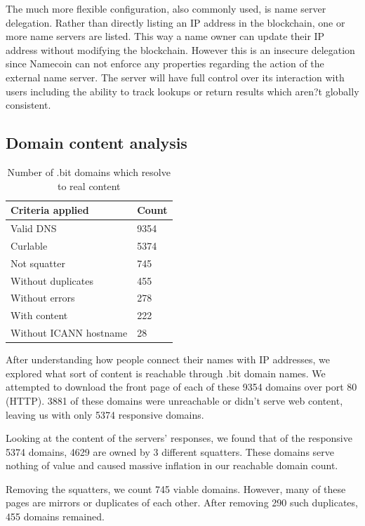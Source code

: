 The much more flexible configuration, also commonly used, is name server delegation. Rather than directly listing an IP address in the blockchain, one or more name servers are listed. This way a name owner can update their IP address without modifying the blockchain. However this is an insecure delegation since Namecoin can not enforce any properties regarding the action of the external name server. The server will have full control over its interaction with users including the ability to track lookups or return results which aren?t globally consistent.

\subsection{Domain content analysis}
\label{domainbreakdown}

\begin{table}[t]
\centering
\begin{tabular}{ll}
Criteria applied & Count \\ \hline
Valid DNS          &  9354  \\
Curlable        & 5374     \\
Not squatter        & 745     \\
Without duplicates      & 455     \\
Without errors              & 278    \\
With content              & 222    \\
Without ICANN hostname   & 28   \\
\end{tabular}
\caption{Number of .bit domains which resolve to real content}
\end{table}

After understanding how people connect their names with IP addresses, we explored what sort of content is reachable through .bit domain names. We attempted to download the front page of each of these 9354 domains over port 80 (HTTP). 3881 of these domains were unreachable or didn't serve web content, leaving us with only 5374 responsive domains.

Looking at the content of the servers' responses, we found that of the responsive 5374 domains, 4629 are owned by 3 different squatters. These domains serve nothing of value and caused massive inflation in our reachable domain count.

Removing the squatters, we count 745 viable domains. However, many of these pages are mirrors or duplicates of each other. After removing 290 such duplicates, 455 domains remained.

